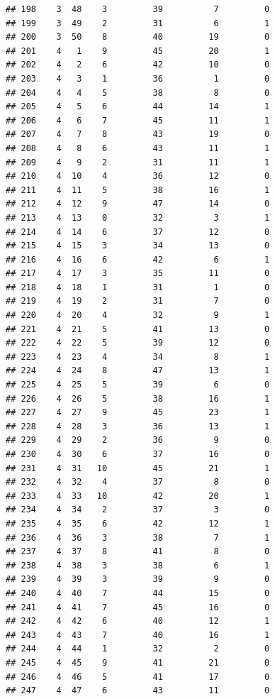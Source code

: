 \documentclass[]{book}
\begin{document}
\begin{verbatim}
## 198    3  48    3         39          7         0
## 199    3  49    2         31          6         1
## 200    3  50    8         40         19         0
## 201    4   1    9         45         20         1
## 202    4   2    6         42         10         0
## 203    4   3    1         36          1         0
## 204    4   4    5         38          8         0
## 205    4   5    6         44         14         1
## 206    4   6    7         45         11         1
## 207    4   7    8         43         19         0
## 208    4   8    6         43         11         1
## 209    4   9    2         31         11         1
## 210    4  10    4         36         12         0
## 211    4  11    5         38         16         1
## 212    4  12    9         47         14         0
## 213    4  13    0         32          3         1
## 214    4  14    6         37         12         0
## 215    4  15    3         34         13         0
## 216    4  16    6         42          6         1
## 217    4  17    3         35         11         0
## 218    4  18    1         31          1         0
## 219    4  19    2         31          7         0
## 220    4  20    4         32          9         1
## 221    4  21    5         41         13         0
## 222    4  22    5         39         12         0
## 223    4  23    4         34          8         1
## 224    4  24    8         47         13         1
## 225    4  25    5         39          6         0
## 226    4  26    5         38         16         1
## 227    4  27    9         45         23         1
## 228    4  28    3         36         13         1
## 229    4  29    2         36          9         0
## 230    4  30    6         37         16         0
## 231    4  31   10         45         21         1
## 232    4  32    4         37          8         0
## 233    4  33   10         42         20         1
## 234    4  34    2         37          3         0
## 235    4  35    6         42         12         1
## 236    4  36    3         38          7         1
## 237    4  37    8         41          8         0
## 238    4  38    3         38          6         1
## 239    4  39    3         39          9         0
## 240    4  40    7         44         15         0
## 241    4  41    7         45         16         0
## 242    4  42    6         40         12         1
## 243    4  43    7         40         16         1
## 244    4  44    1         32          2         0
## 245    4  45    9         41         21         0
## 246    4  46    5         41         17         0
## 247    4  47    6         43         11         0

\end{verbatim}
\end{document}
